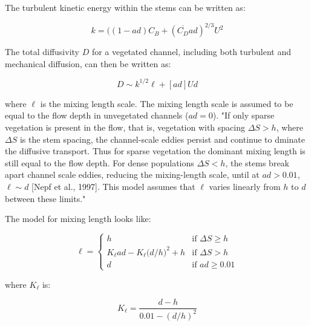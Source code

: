\documentclass[10pt]{article}
\begin{document}
The turbulent kinetic energy within the stems can be written as:

\begin{equation}
k = ((1 - ad) C_B + (\overline{C_D} ad)^{2/3} U^2
\end{equation}

The total diffusivity $D$ for a vegetated channel, including both turbulent and mechanical diffusion, can then be written as:

\begin{equation}
D \sim k^{1/2} \ell + [ad]Ud
\end{equation}

\noindent where $\ell$ is the mixing length scale. The mixing length scale is assumed to be equal to the flow depth in unvegetated channels ($ad = 0$). "If only sparse vegetation is present in the flow, that is, vegetation with spacing $\Delta S > h$, where $\Delta S$ is the stem spacing, the channel-scale eddies persist and continue to dminate the diffusive transport. Thus for sparse vegetation the dominant mixing length is still equal to the flow depth. For dense populations $\Delta S < h$, the stems break apart channel scale eddies, reducing the mixing-length scale, until at $ad > 0.01$, $\ell \sim d$ [Nepf et al., 1997]. This model assumes that $\ell$ varies linearly from $h$ to $d$ between these limits."

The model for mixing length looks like:

\[
 \ell = 
  \begin{cases} 
   h & \text{if } \Delta S \geq h \\
   K_\ell ad - K_\ell \big(d/h\big)^2 + h    & \text{if } \Delta S > h \\
   d & \text{if } ad \geq 0.01
  \end{cases}
\]

\noindent where $K_\ell$ is:

\begin{equation}
K_\ell = \frac{d-h}{0.01 - (d/h)^2}
\end{equation}




\end{document}
